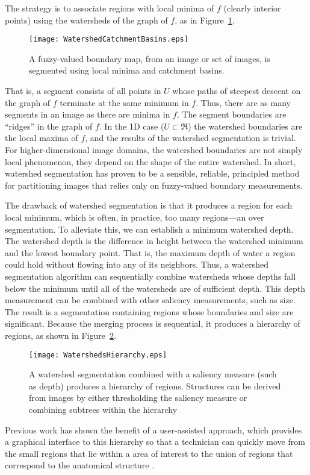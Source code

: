The strategy is to associate regions with local minima of $f$ (clearly interior
points) using the watersheds of the graph of $f$, as in
Figure~\ref{fig:segment}.
\begin{figure}
\centering
\texttt{[image: WatershedCatchmentBasins.eps]}
\caption{A fuzzy-valued boundary map, from an image or set of images, 
is segmented using local minima and catchment basins.}
\protect\label{fig:segment}
\end{figure}
That is, a segment consists of all points in $U$ whose paths of steepest
descent on the graph of $f$ terminate at the same minimum in $f$.  Thus, there
are as many segments in an image as there are minima in $f$.  The segment
boundaries are ``ridges'' \cite{Koenderink1979,Koenderink1993,Eberly1996} in
the graph of $f$.  In the 1D case ($U \subset \Re$) the watershed boundaries
are the local maxima of $f$, and the results of the watershed segmentation is
trivial.  For higher-dimensional image domains, the watershed boundaries are
not simply local phenomenon, they depend on the shape of the entire watershed.
In short, watershed segmentation has proven to be a sensible, reliable,
principled method for partitioning images that relies only on fuzzy-valued
boundary measurements.

The drawback of watershed segmentation is that it produces a region for each
local minimum, which is often, in practice, too many regions---an over
segmentation.  To alleviate this, we can establish a minimum watershed depth.
The watershed depth is the difference in height between the watershed minimum
and the lowest boundary point.  That is, the maximum depth of water a region
could hold without flowing into any of its neighbors.  Thus, a watershed
segmentation algorithm can sequentially combine watersheds whose depths fall
below the minimum until all of the watersheds are of sufficient depth.  This
depth measurement can be combined with other saliency measurements, such as
size.  The result is a segmentation containing regions whose boundaries and
size are significant.  Because the merging process is sequential, it produces a
hierarchy of regions, as shown in Figure~\ref{fig:watersheds}.
\begin{figure}
\centering
\texttt{[image: WatershedsHierarchy.eps]}
\caption{A watershed segmentation combined with a saliency measure 
(such as depth) produces a hierarchy of regions.  Structures can be 
derived from images by either thresholding the saliency measure or 
combining subtrees within the hierarchy}
\protect\label{fig:watersheds}
\end{figure}
Previous work has shown the benefit of a user-assisted approach, which provides
a graphical interface to this hierarchy so that a technician can quickly move
from the small regions that lie within a area of interest to the union of
regions that correspond to the anatomical structure \cite{Yoo1991}.

